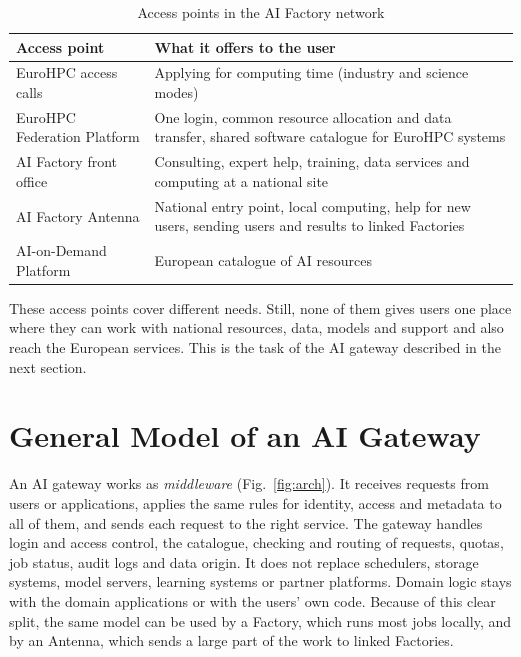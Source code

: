 \documentclass[conference,a4paper]{IEEEtran}
\begin{document}
\begin{table}[!h]
\centering
\caption{Access points in the AI Factory network}
\label{tab:landscape}
\footnotesize
\renewcommand{\arraystretch}{1.1}
\begin{tabular}{@{}p{2.25cm}p{5.75cm}@{}}
\toprule
\textbf{Access point} & \textbf{What it offers to the user} \\
\midrule
EuroHPC access calls & Applying for computing time (industry and science modes) \\
EuroHPC Federation Platform & One login, common resource allocation and data transfer, shared software catalogue for EuroHPC systems \\
AI Factory front office & Consulting, expert help, training, data services and computing at a national site \\
AI Factory Antenna & National entry point, local computing, help for new users, sending users and results to linked Factories \\
AI-on-Demand Platform & European catalogue of AI resources \\
\bottomrule
\end{tabular}
\end{table}

These access points cover different needs. Still, none of them gives users one place where they can work with national resources, data, models and support and also reach the European services. This is the task of the AI gateway described in the next section.

\section{General Model of an AI Gateway}

An AI gateway works as \emph{middleware} (Fig.~\ref{fig:arch}). It receives requests from users or applications, applies the same rules for identity, access and metadata to all of them, and sends each request to the right service. The gateway handles login and access control, the catalogue, checking and routing of requests, quotas, job status, audit logs and data origin. It does not replace schedulers, storage systems, model servers, learning systems or partner platforms. Domain logic stays with the domain applications or with the users' own code. Because of this clear split, the same model can be used by a Factory, which runs most jobs locally, and by an Antenna, which sends a large part of the work to linked Factories.
\end{document}
